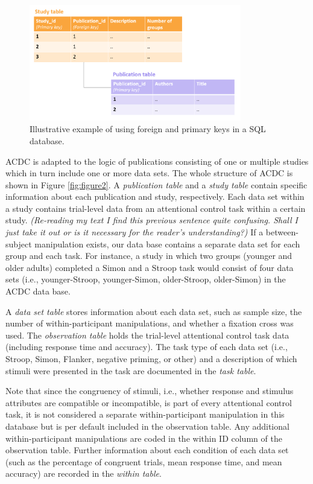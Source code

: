 \documentclass[
  man,floatsintext]{apa6}
\begin{document}
\begin{figure}

{\centering \includegraphics[width=350px]{images/illustrate_SQL_keys} 

}

\caption{Illustrative example of using foreign and primary keys in a SQL database.}\label{fig:figure1}
\end{figure}

ACDC is adapted to the logic of publications consisting of one or multiple studies which in turn include one or more data sets. The whole structure of ACDC is shown in Figure \ref{fig:figure2}. A \emph{publication table} and a \emph{study table} contain specific information about each publication and study, respectively. Each data set within a study contains trial-level data from an attentional control task within a certain study. \emph{ (Re-reading my text I find this previous sentence quite confusing. Shall I just take it out or is it necessary for the reader's understanding?)} If a between-subject manipulation exists, our data base contains a separate data set for each group and each task. For instance, a study in which two groups (younger and older adults) completed a Simon and a Stroop task would consist of four data sets (i.e., younger-Stroop, younger-Simon, older-Stroop, older-Simon) in the ACDC data base.

A \emph{data set table} stores information about each data set, such as sample size, the number of within-participant manipulations, and whether a fixation cross was used. The \emph{observation table} holds the trial-level attentional control task data (including response time and accuracy). The task type of each data set (i.e., Stroop, Simon, Flanker, negative priming, or other) and a description of which stimuli were presented in the task are documented in the \emph{task table}.

Note that since the congruency of stimuli, i.e., whether response and stimulus attributes are compatible or incompatible, is part of every attentional control task, it is not considered a separate within-participant manipulation in this database but is per default included in the observation table. Any additional within-participant manipulations are coded in the within ID column of the observation table. Further information about each condition of each data set (such as the percentage of congruent trials, mean response time, and mean accuracy) are recorded in the \emph{within table}.
\end{document}
